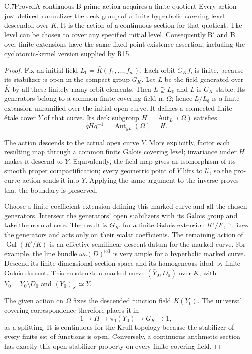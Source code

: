 \begin{statement}{C.7}{Proved}{A continuous B-prime action acquires a finite quotient}
Every action just defined normalizes the deck group of a finite
hyperbolic covering level descended over $K$. It is the action of a
continuous section for that quotient. The level can be chosen to
cover any specified initial level. Consequently B$'$ and B over
finite extensions have the same fixed-point existence assertion,
including the cyclotomic-kernel version supplied by R15.
\end{statement}
\begin{proof}
Fix an initial field $L_0=\bar K(f_1,\ldots,f_m)$. Each orbit
$G_K f_i$ is finite, because its stabilizer is open in the compact
group $G_K$. Let $L$ be the field generated over $\bar K$ by all
these finitely many orbit elements. Then $L\supseteq L_0$ and
$L$ is $G_K$-stable. Its generators belong to a common finite
covering field in $\Omega$; hence $L/L_0$ is a finite extension
unramified over the initial open curve. It defines a connected
finite \'etale cover $Y$ of that curve. Its deck subgroup
$H=\operatorname{Aut}_L(\Omega)$ satisfies
\[
 gHg^{-1}=\operatorname{Aut}_{gL}(\Omega)=H.
 \tag{C.7.1}
\]

The action descends to the actual open curve $Y$. More explicitly,
factor each resulting map through a common finite Galois covering
level; invariance under $H$ makes it descend to $Y$. Equivalently,
the field map gives an isomorphism of its smooth proper
compactification; every geometric point of $Y$ lifts to
$\mathcal U$, so the pro-curve action sends it into $Y$. Applying
the same argument to the inverse proves that the boundary is
preserved.

Choose a finite coefficient extension defining this marked curve
and all the chosen generators. Intersect the generators' open
stabilizers with its Galois group and take the normal core. The
result is $G_{K'}$ for a finite Galois extension $K'/K$; it fixes
the generators and acts only on their scalar coefficients.
The remaining action of $\operatorname{Gal}(K'/K)$ is an effective
semilinear descent datum for the marked curve. For example,
the line bundle $\omega_{\bar Y}(D)^{\otimes3}$ is very ample
for a hyperbolic marked curve. Descend its finite-dimensional
section space and its homogeneous ideal by finite Galois descent.
This constructs a marked curve $(\bar Y_0,D_0)$ over $K$, with
$Y_0=\bar Y_0\setminus D_0$ and $(Y_0)_{\bar K}\simeq Y$.

The given action on $\Omega$ fixes the descended function field
$K(Y_0)$. The universal covering correspondence therefore places
it in
\[
 1\longrightarrow H\longrightarrow\pi_1(Y_0)
   \longrightarrow G_K\longrightarrow1,
\]
as a splitting. It is continuous for the Krull topology because
the stabilizer of every finite set of functions is open. Conversely,
a continuous arithmetic section has exactly this open-stabilizer
property on every finite covering field.


\end{proof}
